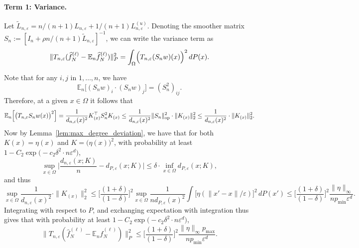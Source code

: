 \documentclass{article}
\newcommand{\1}{\mathbf{1}}
\newcommand{\Ebb}{\mathbb{E}}
\newcommand{\wt}[1]{\widetilde{#1}}
\newcommand{\wh}[1]{\widehat{#1}}
\theoremstyle{alden}
\theoremstyle{aldenthm}
\theoremstyle{definition}
\theoremstyle{remark}
\begin{document}
\paragraph{Term 1: Variance.}
Let $\wt{L}_{n,\varepsilon} = n/(n + 1) L_{n,\varepsilon} + 1/(n + 1) L_{n,\varepsilon}^{(u)}$. Denoting the smoother matrix $S_n := [I_n + \rho n/(n + 1)\wt{L}_{n,\varepsilon}]^{-1}$, we can write the variance term as
\begin{equation*}
\|T_{n,\varepsilon}(\wh{f}_N^{(\ell)} - \mathbb{E}_{n}\wh{f}_N^{(\ell)})\|_P^2 =  \int_{\Omega} \Bigl(T_{n,\varepsilon}(S_nw)(x)\Bigr)^2 \,dP(x).
\end{equation*}

Note that for any $i,j$ in $1,\ldots,n$, we have
\begin{equation*}
\Ebb_n\bigl[(S_nw)_i \cdot (S_nw)_j\bigr] = (S_n^2)_{ij}.
\end{equation*}
Therefore, at a given $x \in \Omega$ it follows that
\begin{equation*}
\Ebb_n\Bigl[\bigl(T_{n,\varepsilon}S_nw(x)\bigr)^2\Bigr] = \frac{1}{d_{n,\varepsilon}(x)^2} K_{(x)}^{\top} S_n^2 K_{(x)} \leq \frac{1}{d_{n,\varepsilon}(x)^2} \|S_n\|_{\textrm{op}}^2 \cdot \|K_{(x)}\|_2^2 \leq \frac{1}{d_{n,\varepsilon}(x)^2} \cdot \|K_{(x)}\|_2^2.
\end{equation*}
Now by Lemma~\ref{lem:max_degree_deviation}, we have that for both $K(x) = \eta(x)$ and $K = \bigl(\eta(x)\bigr)^2$, with probability at least $1 - C_2\exp\bigl(-c_2 \delta^2 \cdot n \varepsilon^d\bigr)$,
\begin{equation}
\label{pf:out_of_sample_laplacian_regularization_1}
\sup_{x \in \Omega} \biggl|\frac{d_{n,\varepsilon}(x; K)}{n} - d_{P,\varepsilon}(x; K)\biggr| \leq \delta \cdot \inf_{x \in \Omega} d_{P,\varepsilon}(x; K),
\end{equation}
and thus
\begin{equation*}
\sup_{x \in \Omega}\frac{1}{d_{n,\varepsilon}(x)^2} \cdot \|K_{(x)}\|_2^2 \leq \biggl[\frac{(1 + \delta)}{(1 - \delta)}\biggr]^2 \sup_{x \in \Omega} \frac{1}{nd_{P,\varepsilon}(x)^2} \int \bigl[\eta(\|x'-x\|/\varepsilon)\bigr]^2 \,dP(x') \leq \biggl[\frac{(1 + \delta)}{(1 - \delta)}\biggr]^2 \frac{\|\eta\|_{\infty}}{n p_{\min} \varepsilon^d}.
\end{equation*}
Integrating with respect to $P$, and exchanging expectation with integration thus gives that with probability at least $1 - C_2\exp\bigl(-c_2 \delta^2 \cdot n \varepsilon^d\bigr)$,
\begin{equation*}
\|T_{n,\varepsilon}(\wh{f}_N^{(\ell)} - \mathbb{E}_{n}\wh{f}_N^{(\ell)})\|_P^2 \leq \biggl[\frac{(1 + \delta)}{(1 - \delta)}\biggr]^2 \frac{\|\eta\|_{\infty} p_{\max}}{n p_{\min} \varepsilon^d}.
\end{equation*}
\end{document}
